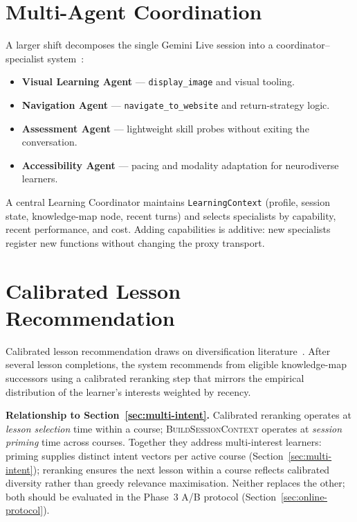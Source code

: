 \section{Multi-Agent Coordination}
\label{sec:multi-agent}

A larger shift decomposes the single Gemini Live session into a coordinator--specialist system~\cite{midscene2024,sprout2026multiagent}:
\begin{itemize}
    \item \textbf{Visual Learning Agent} --- \texttt{display\_image} and visual tooling.
    \item \textbf{Navigation Agent} --- \texttt{navigate\_to\_website} and return-strategy logic.
    \item \textbf{Assessment Agent} --- lightweight skill probes without exiting the conversation.
    \item \textbf{Accessibility Agent} --- pacing and modality adaptation for neurodiverse learners.
\end{itemize}

A central Learning Coordinator maintains \texttt{LearningContext} (profile, session state, knowledge-map node, recent turns) and selects specialists by capability, recent performance, and cost. Adding capabilities is additive: new specialists register new functions without changing the proxy transport.

\section{Calibrated Lesson Recommendation}
\label{sec:calibrated-rec}

Calibrated lesson recommendation draws on diversification literature~\cite{steck2018calibrated,carbonell1998mmr,anh2026mmr}. After several lesson completions, the system recommends from eligible knowledge-map successors using a calibrated reranking step that mirrors the empirical distribution of the learner's interests weighted by recency.

\textbf{Relationship to Section~\ref{sec:multi-intent}.} Calibrated reranking operates at \emph{lesson selection} time within a course; \textsc{BuildSessionContext} operates at \emph{session priming} time across courses. Together they address multi-interest learners: priming supplies distinct intent vectors per active course (Section~\ref{sec:multi-intent}); reranking ensures the next lesson within a course reflects calibrated diversity rather than greedy relevance maximisation. Neither replaces the other; both should be evaluated in the Phase~3 A/B protocol (Section~\ref{sec:online-protocol}).

